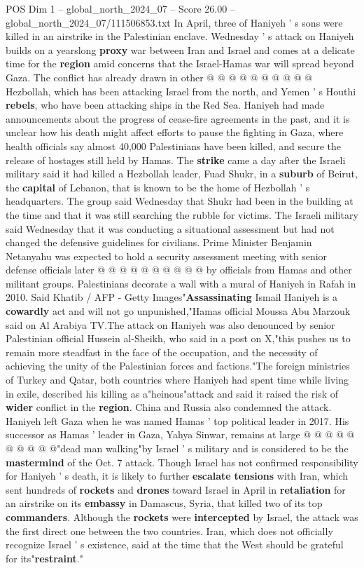 \begin{textsample}{POS Dim 1 – global\_north\_2024\_07 – Score 26.00 – global\_north\_2024\_07/111506853.txt}
In April, three of Haniyeh ' s sons were killed in an airstrike in the Palestinian enclave.
Wednesday ' s attack on Haniyeh builds on a yearslong \textbf{proxy} war between Iran and Israel and comes at a delicate time for the \textbf{region} amid concerns that the Israel-Hamas war will spread beyond Gaza.
The conflict has already drawn in other @ @ @ @ @ @ @ @ @ @ Hezbollah, which has been attacking Israel from the north, and Yemen ' s Houthi \textbf{rebels}, who have been attacking ships in the Red Sea.
Haniyeh had made announcements about the progress of cease-fire agreements in the past, and it is unclear how his death might affect efforts to pause the fighting in Gaza, where health officials say almost 40,000 Palestinians have been killed, and secure the release of hostages still held by Hamas.
The \textbf{strike} came a day after the Israeli military said it had killed a Hezbollah leader, Fuad Shukr, in a \textbf{suburb} of Beirut, the \textbf{capital} of Lebanon, that is known to be the home of Hezbollah ' s headquarters.
The group said Wednesday that Shukr had been in the building at the time and that it was still searching the rubble for victims.
The Israeli military said Wednesday that it was conducting a situational assessment but had not changed the defensive guidelines for civilians.
Prime Minister Benjamin Netanyahu was expected to hold a security assessment meeting with senior defense officials later @ @ @ @ @ @ @ @ @ @ by officials from Hamas and other militant groups.
Palestinians decorate a wall with a mural of Haniyeh in Rafah in 2010.
Said Khatib / AFP - Getty Images"\textbf{Assassinating} Ismail Haniyeh is a \textbf{cowardly} act and will not go unpunished,"Hamas official Moussa Abu Marzouk said on Al Arabiya TV.The attack on Haniyeh was also denounced by senior Palestinian official Hussein al-Sheikh, who said in a post on X,"this pushes us to remain more steadfast in the face of the occupation, and the necessity of achieving the unity of the Palestinian forces and factions."The foreign ministries of Turkey and Qatar, both countries where Haniyeh had spent time while living in exile, described his killing as a"heinous"attack and said it raised the risk of \textbf{wider} conflict in the \textbf{region}.
China and Russia also condemned the attack.
Haniyeh left Gaza when he was named Hamas ' top political leader in 2017.
His successor as Hamas ' leader in Gaza, Yahya Sinwar, remains at large @ @ @ @ @ @ @ @ @ @"dead man walking"by Israel ' s military and is considered to be the \textbf{mastermind} of the Oct. 7 attack.
Though Israel has not confirmed responsibility for Haniyeh ' s death, it is likely to further \textbf{escalate} \textbf{tensions} with Iran, which sent hundreds of \textbf{rockets} and \textbf{drones} toward Israel in April in \textbf{retaliation} for an airstrike on its \textbf{embassy} in Damascus, Syria, that killed two of its top \textbf{commanders}.
Although the \textbf{rockets} were \textbf{intercepted} by Israel, the attack was the first direct one between the two countries.
Iran, which does not officially recognize Israel ' s existence, said at the time that the West should be grateful for its"\textbf{restraint}."


\end{textsample}
